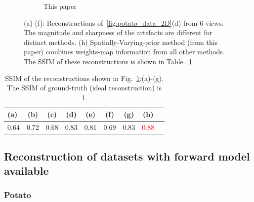 \documentclass[journal]{IEEEtran}
\begin{document}
\begin{figure}[!h]
\begin{subfigure}[b]{0.24\linewidth}
        \caption{This paper}
     \end{subfigure}
      \caption{(a)-(f): Reconstructions of~\ref{fig:potato_data_2D}(d)
        from $6$ views. The magnitude and sharpness of the artefacts
        are different for distinct methods. (h)
        Spatially-Varying-prior method (from this paper) combines
        weights-map information from all other methods. The SSIM of
        these reconstructions is shown in
        Table.~\ref{table:potato_2D_ssim}.}
\label{fig:reconstructions_diff_methods}
\end{figure}
\begin{table}[!h]
  \centering
\caption{SSIM of the reconstructions shown in Fig.~\ref{fig:reconstructions_diff_methods}:(a)-(g). The SSIM of ground-truth (ideal reconstruction) is 1.}
\begin{tabular}{|l|c|c|c|c|c|c|c|c|}
\hline
  \textbf{(a)} & \textbf{(b)} & \textbf{(c)} & \textbf{(d)} & \textbf{(e)} & \textbf{(f)} &  \textbf{(g)} &  \textbf{(h)} \\\hline
 0.64 & 0.72  & 0.68 & 0.83 & 0.81 & 0.69 & 0.83 &\textcolor{red}{0.88} \\ \hline
\end{tabular}
\label{table:potato_2D_ssim}
\end{table}

\subsection{Reconstruction of datasets with forward model available}
\subsubsection{\textbf{Potato}}
\label{Sec:potato_spatially_varying}
\end{document}
